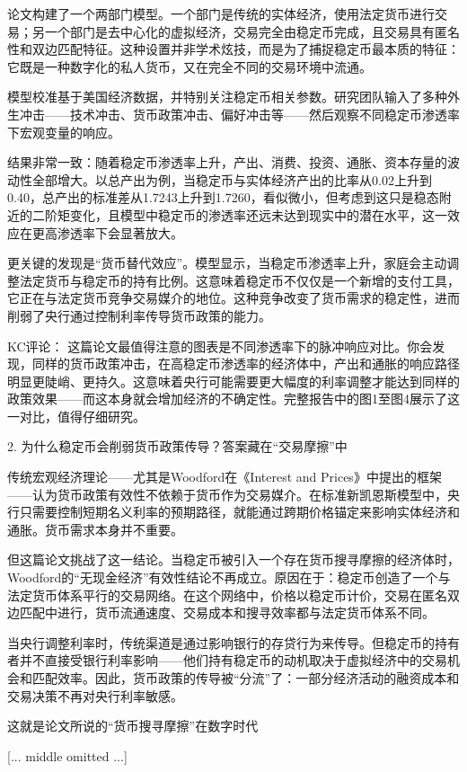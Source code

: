 \documentclass[11pt]{ctexart}
\begin{document}
论文构建了一个两部门模型。一个部门是传统的实体经济，使用法定货币进行交易；另一个部门是去中心化的虚拟经济，交易完全由稳定币完成，且交易具有匿名性和双边匹配特征。这种设置并非学术炫技，而是为了捕捉稳定币最本质的特征：它既是一种数字化的私人货币，又在完全不同的交易环境中流通。

模型校准基于美国经济数据，并特别关注稳定币相关参数。研究团队输入了多种外生冲击——技术冲击、货币政策冲击、偏好冲击等——然后观察不同稳定币渗透率下宏观变量的响应。

结果非常一致：随着稳定币渗透率上升，产出、消费、投资、通胀、资本存量的波动性全部增大。以总产出为例，当稳定币与实体经济产出的比率从0.02上升到0.40，总产出的标准差从1.7243上升到1.7260，看似微小，但考虑到这只是稳态附近的二阶矩变化，且模型中稳定币的渗透率还远未达到现实中的潜在水平，这一效应在更高渗透率下会显著放大。

更关键的发现是“货币替代效应”。模型显示，当稳定币渗透率上升，家庭会主动调整法定货币与稳定币的持有比例。这意味着稳定币不仅仅是一个新增的支付工具，它正在与法定货币竞争交易媒介的地位。这种竞争改变了货币需求的稳定性，进而削弱了央行通过控制利率传导货币政策的能力。

KC评论： 这篇论文最值得注意的图表是不同渗透率下的脉冲响应对比。你会发现，同样的货币政策冲击，在高稳定币渗透率的经济体中，产出和通胀的响应路径明显更陡峭、更持久。这意味着央行可能需要更大幅度的利率调整才能达到同样的政策效果——而这本身就会增加经济的不确定性。完整报告中的图1至图4展示了这一对比，值得仔细研究。

2. 为什么稳定币会削弱货币政策传导？答案藏在“交易摩擦”中

传统宏观经济理论——尤其是Woodford在《Interest and Prices》中提出的框架——认为货币政策有效性不依赖于货币作为交易媒介。在标准新凯恩斯模型中，央行只需要控制短期名义利率的预期路径，就能通过跨期价格锚定来影响实体经济和通胀。货币需求本身并不重要。

但这篇论文挑战了这一结论。当稳定币被引入一个存在货币搜寻摩擦的经济体时，Woodford的“无现金经济”有效性结论不再成立。原因在于：稳定币创造了一个与法定货币体系平行的交易网络。在这个网络中，价格以稳定币计价，交易在匿名双边匹配中进行，货币流通速度、交易成本和搜寻效率都与法定货币体系不同。

当央行调整利率时，传统渠道是通过影响银行的存贷行为来传导。但稳定币的持有者并不直接受银行利率影响——他们持有稳定币的动机取决于虚拟经济中的交易机会和匹配效率。因此，货币政策的传导被“分流”了：一部分经济活动的融资成本和交易决策不再对央行利率敏感。

这就是论文所说的“货币搜寻摩擦”在数字时代

[... middle omitted ...]
\end{document}

